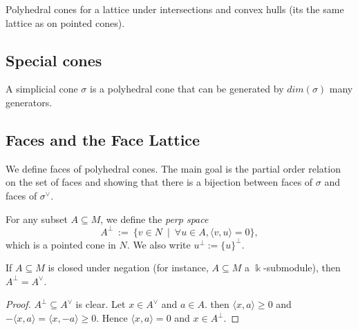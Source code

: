 \begin{proposition}
  \label{polyhedra-lattice}
  Polyhedral cones for a lattice under intersections and convex hulls (its the same lattice as on pointed cones).
\end{proposition}

\subsection{Special cones}

\begin{proposition}
  \label{simplicial-cone}
  A simplicial cone \(\sigma\) is a polyhedral cone that can be generated by \(dim (\sigma)\) many
  generators.
\end{proposition}

\subsection{Faces and the Face Lattice}

We define faces of polyhedral cones. The main goal is the partial
order relation on the set of faces and showing that there is a
bijection between faces of \( \sigma \) and faces of \( \sigma^{\vee}
\).

\begin{definition}
  \label{perp}
  \uses{}
  For any subset \( A \subseteq M \), we define the \emph{perp space}
  \[
      A^{\perp}\ :=\ \{v \in N\ \mid\ \forall u \in A, \langle v, u \rangle = 0\},
  \]
  which is a pointed cone in \( N \). We also write \( u^{\perp} :=
  \{u\}^{\perp} \).
\end{definition}

\begin{lemma}
  \label{perp-closed-negation}
  \uses{}
  If \( A \subseteq M \) is closed under negation (for instance, \( A
  \subseteq M \) a \( \Bbbk \)-submodule), then \( A^{\perp} =
  A^{\vee} \).
\end{lemma}
\begin{proof}
  \uses{}
  \( A^{\perp} \subseteq A^{\vee} \) is clear. Let \( x \in A^{\vee}
  \) and \( a \in A \). then \( \langle x, a \rangle \geq 0 \) and \(
  -\langle x, a \rangle = \langle x, -a \rangle \geq 0 \). Hence \(
  \langle x, a \rangle = 0 \) and \( x \in A^{\perp} \).
\end{proof}


